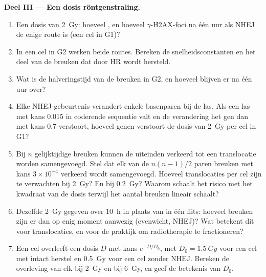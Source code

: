 \begin{problem}
\medskip
\noindent\textbf{Deel III --- Een dosis röntgenstraling.}
\begin{enumerate}[resume]
  \item Een dosis van \qty{2}{Gy}: hoeveel , en
        hoeveel $\gamma$-H2AX-foci na één uur als NHEJ de enige route
        is (een cel in G1)?
  \item In een cel in G2 werken beide routes. Bereken de
        snelheidsconstanten en het deel van de breuken dat door HR
        wordt hersteld.
  \item Wat is de halveringstijd van de breuken in G2, en hoeveel
        blijven er na één uur over?
  \item Elke NHEJ-gebeurtenis verandert enkele basenparen bij de las.
        Als een las met kans $0.015$ in coderende sequentie valt en de
        verandering het gen dan met kans $0.7$ verstoort, hoeveel genen
        verstoort de dosis van \qty{2}{Gy} per cel in G1?
  \item Bij $n$ gelijktijdige breuken kunnen de uiteinden verkeerd tot
        een translocatie worden samengevoegd. Stel dat elk van de
        $n(n-1)/2$ paren breuken met kans $3\times 10^{-4}$ verkeerd
        wordt samengevoegd. Hoeveel translocaties per cel zijn te
        verwachten bij \qty{2}{Gy}? En bij \qty{0.2}{Gy}? Waarom
        schaalt het risico met het kwadraat van de dosis terwijl het
        aantal breuken lineair schaalt?
  \item Dezelfde \qty{2}{Gy} gegeven over \qty{10}{h} in plaats van in
        één flits: hoeveel breuken zijn er dan op enig moment aanwezig
        (evenwicht, NHEJ)? Wat betekent dit voor translocaties, en voor
        de praktijk om radiotherapie te fractioneren?
  \item Een cel overleeft een dosis $D$ met kans $e^{-D/D_{0}}$, met
        $D_{0} = \qty{1.5}{Gy}$ voor een cel met intact herstel en
        \qty{0.5}{Gy} voor een cel zonder NHEJ. Bereken de overleving
        van elk bij \qty{2}{Gy} en bij \qty{6}{Gy}, en geef de
        betekenis van $D_{0}$.
\end{enumerate}


\end{problem}
